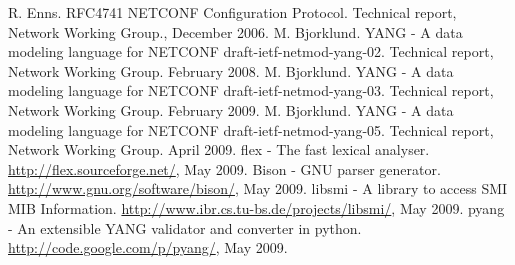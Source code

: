 \documentclass[conference]{IEEEtran}
\begin{document}
\begin{thebibliography}{1}
 R. Enns. RFC4741 NETCONF Configuration Protocol. Technical report, Network Working Group.,
December 2006.
 M. Bjorklund. YANG - A data modeling language for NETCONF draft-ietf-netmod-yang-02. Technical report, Network Working Group. February 2008.
 M. Bjorklund. YANG - A data modeling language for NETCONF draft-ietf-netmod-yang-03. Technical report, Network Working Group. February 2009.
 M. Bjorklund. YANG - A data modeling language for NETCONF draft-ietf-netmod-yang-05. Technical report, Network Working Group. April 2009.
 flex - The fast lexical analyser. \url{http://flex.sourceforge.net/}, May 2009.
 Bison - GNU parser generator. \url{http://www.gnu.org/software/bison/}, May 2009.
 libsmi - A library to access SMI MIB Information. \url{http://www.ibr.cs.tu-bs.de/projects/libsmi/}, May 2009.
 pyang - An extensible YANG validator and converter in python. \url{http://code.google.com/p/pyang/}, May 2009.

\end{thebibliography}
\end{document}
